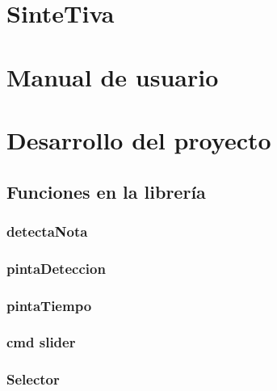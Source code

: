 \documentclass[12pt,a4paper]{article}
\begin{document}
\begin{titlepage} 
%
\end{titlepage}

\tableofcontents
\newpage

\lstset{language=C++} 
\section{SinteTiva}

\section{Manual de usuario}

\section{Desarrollo del proyecto}

\subsection{Funciones en la librería}

\subsubsection{detectaNota}

\subsubsection{pintaDeteccion}

\subsubsection{pintaTiempo}

\subsubsection{cmd slider}

\subsubsection{Selector}

\end{document}
